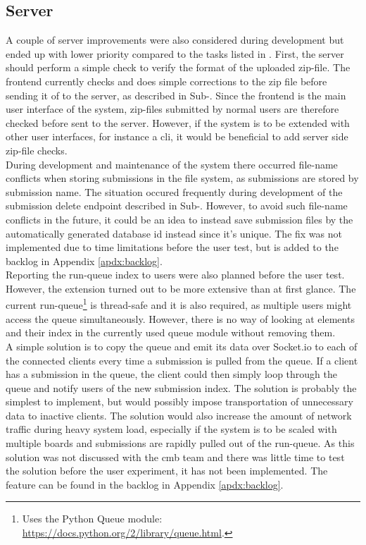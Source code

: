 \subsection{Server}
\label{sec:disc-server}
A couple of server improvements were also considered during development but ended up with lower priority compared to the tasks listed in . First, the server should perform a simple check to verify the format of the uploaded zip-file. The frontend currently checks and does simple corrections to the zip file before sending it of to the server, as described in Sub-. Since the frontend is the main user interface of the system, zip-files submitted by normal users are therefore checked before sent to the server. However, if the system is to be extended with other user interfaces, for instance a \gls{cli}, it would be beneficial to add server side zip-file checks. \\

During development and maintenance of the system there occurred file-name conflicts when storing submissions in the file system, as submissions are stored by submission name. The situation occured frequently during development of the submission delete endpoint described in Sub-. However, to avoid such file-name conflicts in the future, it could be an idea to instead save submission files by the automatically generated database id instead since it's unique. The fix was not implemented due to time limitations before the user test, but is added to the backlog in Appendix \ref{apdx:backlog}. \\

Reporting the run-queue index to users were also planned before the user test. However, the extension turned out to be more extensive than at first glance. The current run-queue\footnote{Uses the Python Queue module: \url{https://docs.python.org/2/library/queue.html}.} is thread-safe and it is also required, as multiple users might access the queue simultaneously. However, there is no way of looking at elements and their index in the currently used queue module without removing them.  \\

A simple solution is to copy the queue and emit its data over Socket.io to each of the connected clients every time a submission is pulled from the queue. If a client has a submission in the queue, the client could then simply loop through the queue and notify users of the new submission index. The solution is probably the simplest to implement, but would possibly impose transportation of unnecessary data to inactive clients. The solution would also increase the amount of network traffic during heavy system load, especially if the system is to be scaled with multiple boards and submissions are rapidly pulled out of the run-queue. As this solution was not discussed with the \gls{cmb} team and there was little time to test the solution before the user experiment, it has not been implemented. The feature can be found in the backlog in Appendix \ref{apdx:backlog}. \\


